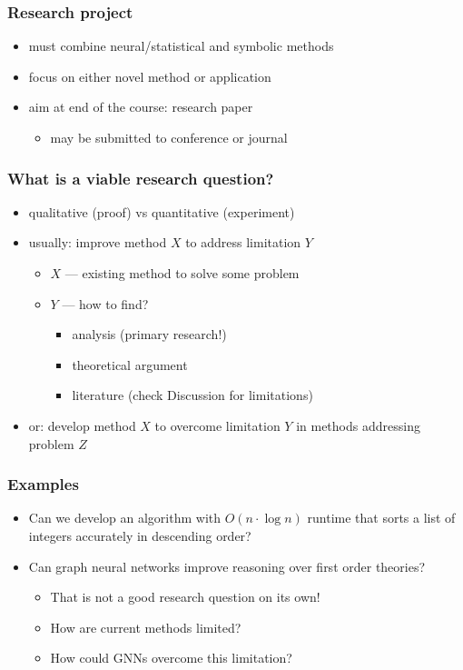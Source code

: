 \documentclass{beamer}
\begin{document}
\begin{frame}
  \frametitle{Research project}
  \begin{itemize}
  \item must combine neural/statistical and symbolic methods
  \item focus on either novel method or application
  \item aim at end of the course: research paper
    \begin{itemize}
    \item may be submitted to conference or journal
    \end{itemize}
  \end{itemize}
\end{frame}

\begin{frame}
  \frametitle{What is a viable research question?}
  \begin{itemize}
  \item qualitative (proof) vs quantitative (experiment)
  \item usually: improve method $X$ to address limitation $Y$
    \begin{itemize}
    \item $X$ --- existing method to solve some problem
    \item $Y$ --- how to find?
      \begin{itemize}
      \item analysis (primary research!)
      \item theoretical argument
      \item literature (check Discussion for limitations)
      \end{itemize}
    \end{itemize}
  \item or: develop method $X$ to overcome limitation $Y$ in methods
    addressing problem $Z$
  \end{itemize}
\end{frame}

\begin{frame}
  \frametitle{Examples}
  \begin{itemize}
  \item Can we develop an algorithm with $O(n \cdot \log{n})$ runtime
    that sorts a list of integers accurately in descending order?
    \pause
  \item Can graph neural networks improve reasoning over first order
    theories?
    \pause
    \begin{itemize}
    \item That is not a good research question on its own!
    \item How are current methods limited?
    \item How could GNNs overcome this limitation?
    \end{itemize}
  \end{itemize}
\end{frame}
\end{document}
